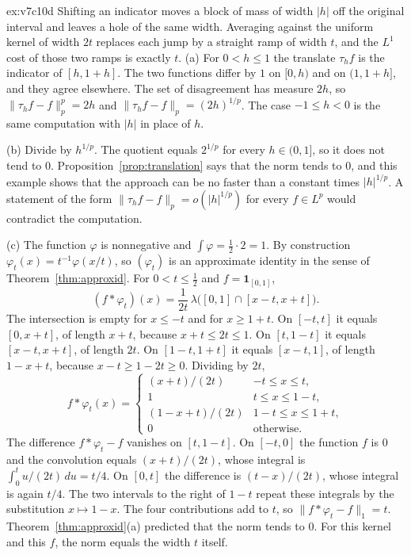 \begin{solution}{ex:v7c10d}
\idea Shifting an indicator moves a block of mass of width $|h|$ off the original interval and leaves a hole of the same width. Averaging against the uniform kernel of width $2t$ replaces each jump by a straight ramp of width $t$, and the $L^1$ cost of those two ramps is exactly $t$.
\writeup (a) For $0<h\le1$ the translate $\tau_hf$ is the indicator of $[h,1+h]$. The two functions differ by $1$ on $[0,h)$ and on $(1,1+h]$, and they agree elsewhere. The set of disagreement has measure $2h$, so $\|\tau_hf-f\|_p^p=2h$ and $\|\tau_hf-f\|_p=(2h)^{1/p}$. The case $-1\le h<0$ is the same computation with $|h|$ in place of $h$.

(b) Divide by $h^{1/p}$. The quotient equals $2^{1/p}$ for every $h\in(0,1]$, so it does not tend to $0$. Proposition~\ref{prop:translation} says that the norm tends to $0$, and this example shows that the approach can be no faster than a constant times $|h|^{1/p}$. A statement of the form $\|\tau_hf-f\|_p=o(|h|^{1/p})$ for every $f\in L^p$ would contradict the computation.

(c) The function $\varphi$ is nonnegative and $\int\varphi=\frac12\cdot2=1$. By construction $\varphi_t(x)=t^{-1}\varphi(x/t)$, so $(\varphi_t)$ is an approximate identity in the sense of Theorem~\ref{thm:approxid}. For $0<t\le\frac12$ and $f=\mathbf 1_{[0,1]}$,
\[(f*\varphi_t)(x)=\frac1{2t}\,\lambda\bigl([0,1]\cap[x-t,x+t]\bigr).\]
The intersection is empty for $x\le -t$ and for $x\ge 1+t$. On $[-t,t]$ it equals $[0,x+t]$, of length $x+t$, because $x+t\le 2t\le1$. On $[t,1-t]$ it equals $[x-t,x+t]$, of length $2t$. On $[1-t,1+t]$ it equals $[x-t,1]$, of length $1-x+t$, because $x-t\ge1-2t\ge0$. Dividing by $2t$,
\[
f*\varphi_t(x)=\begin{cases}
(x+t)/(2t) & -t\le x\le t,\\
1 & t\le x\le 1-t,\\
(1-x+t)/(2t) & 1-t\le x\le 1+t,\\
0 & \text{otherwise.}
\end{cases}
\]
The difference $f*\varphi_t-f$ vanishes on $[t,1-t]$. On $[-t,0]$ the function $f$ is $0$ and the convolution equals $(x+t)/(2t)$, whose integral is $\int_0^t u/(2t)\,du=t/4$. On $[0,t]$ the difference is $(t-x)/(2t)$, whose integral is again $t/4$. The two intervals to the right of $1-t$ repeat these integrals by the substitution $x\mapsto 1-x$. The four contributions add to $t$, so $\|f*\varphi_t-f\|_1=t$. Theorem~\ref{thm:approxid}(a) predicted that the norm tends to $0$. For this kernel and this $f$, the norm equals the width $t$ itself.
\end{solution}

